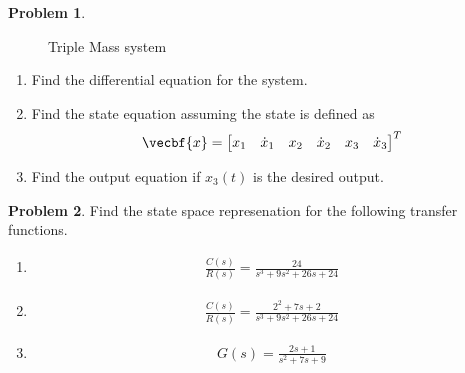 \documentclass[10pt]{article}
\theoremstyle{definition}
\newtheorem{prob}{Problem}[section]
\newenvironment{subprob}%
{\renewcommand{\theenumi}{\alph{enumi}}\renewcommand{\labelenumi}{(\theenumi)}\begin{enumerate}}%
{\end{enumerate}}%
\begin{document}
\begin{prob}
\begin{figure}[h]
    \caption{Triple Mass system~\label{fig:triple_mass}}
    \end{figure}

    \begin{subprob}
        \item Find the differential equation for the system.
        \item Find the state equation assuming the state is defined as
            \begin{align*}
                \vecbf{x} = \begin{bmatrix} x_1 & \dot{x}_1 & x_2 & \dot{x}_2 & x_3 & \dot{x}_3\end{bmatrix}^T
            \end{align*}

        \item Find the output equation if \( x_3(t)\) is the desired output.
    \end{subprob}
\end{prob}

\begin{prob}
   Find the  state space represenation for the following transfer functions.
   \begin{subprob}
        \item  
            \begin{align*}
                \frac{C(s)}{R(s)} = \frac{24}{s^3 + 9s^2 + 26s + 24}
            \end{align*}
        \item 
            \begin{align*}
                \frac{C(s)}{R(s)} = \frac{2^2 + 7s + 2}{s^3 + 9s^2 + 26s + 24}
            \end{align*}

        \item 
            \begin{align*}
                G(s) = \frac{2s + 1}{s^2 + 7s +9}
            \end{align*}
   \end{subprob}
\end{prob}
\end{document}
